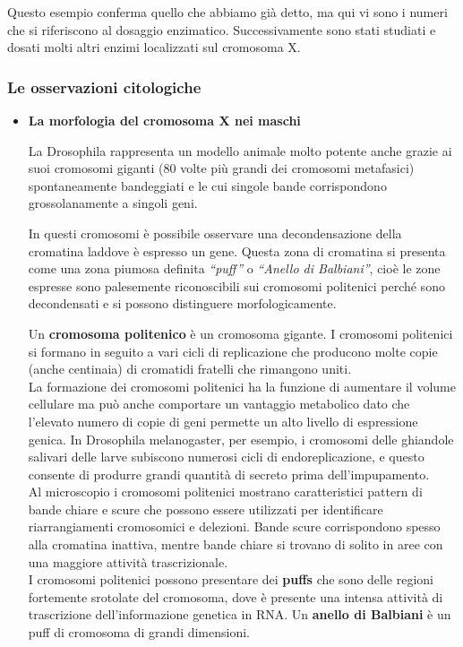 \documentclass[11pt]{book}
\begin{document}
Questo esempio conferma quello che abbiamo già detto, ma qui vi sono i numeri che si riferiscono al dosaggio enzimatico. Successivamente sono stati studiati e dosati molti altri enzimi localizzati sul cromosoma X.

\subsubsection{Le osservazioni citologiche}
\begin{itemize}
\item \textbf{La morfologia del cromosoma X nei maschi}

La Drosophila rappresenta un modello animale molto potente anche grazie ai suoi cromosomi giganti (80 volte più grandi dei cromosomi metafasici) spontaneamente bandeggiati e le cui singole bande corrispondono grossolanamente a singoli geni.

In questi cromosomi è possibile osservare una decondensazione della cromatina laddove è espresso un gene. Questa zona di cromatina si presenta come una zona piumosa definita \emph{``puff''} o \emph{``Anello di Balbiani''}, cioè le zone espresse sono palesemente riconoscibili sui cromosomi politenici perché sono decondensati e si possono distinguere morfologicamente.

Un \textbf{cromosoma politenico} è un cromosoma gigante. I cromosomi politenici si formano in seguito a vari cicli di replicazione che producono molte copie (anche centinaia) di cromatidi fratelli che rimangono uniti.\\
La formazione dei cromosomi politenici ha la funzione di aumentare il volume cellulare ma può anche comportare un vantaggio metabolico dato che l'elevato numero di copie di geni permette un alto livello di espressione genica. In Drosophila melanogaster, per esempio, i cromosomi delle ghiandole salivari delle larve subiscono numerosi cicli di endoreplicazione, e questo consente di produrre grandi quantità di secreto prima dell'impupamento.\\
Al microscopio i cromosomi politenici mostrano caratteristici pattern di bande chiare e scure che possono essere utilizzati per identificare riarrangiamenti cromosomici e delezioni. Bande scure corrispondono spesso alla cromatina inattiva, mentre bande chiare si trovano di solito in aree con una maggiore attività trascrizionale.\\
I cromosomi politenici possono presentare dei \textbf{puffs} che sono delle regioni fortemente srotolate del cromosoma, dove è presente una intensa attività di trascrizione dell'informazione genetica in RNA. Un \textbf{anello di Balbiani} è un puff di cromosoma di grandi dimensioni.


\end{itemize}
\end{document}
